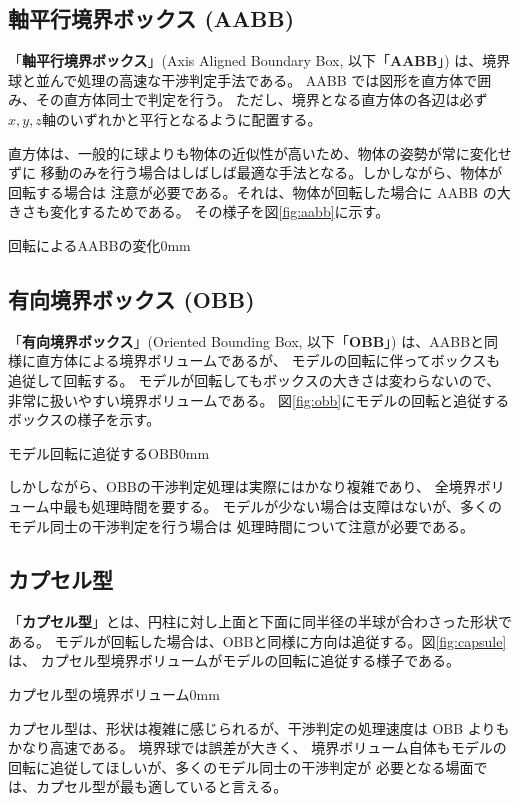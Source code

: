 \subsection{軸平行境界ボックス (AABB)}
「\textbf{軸平行境界ボックス}」(Axis Aligned Boundary Box, 以下「\textbf{AABB}」)
は、境界球と並んで処理の高速な干渉判定手法である。
AABB では図形を直方体で囲み、その直方体同士で判定を行う。
ただし、境界となる直方体の各辺は必ず \(x,y,z軸\)のいずれかと平行となるように配置する。

直方体は、一般的に球よりも物体の近似性が高いため、物体の姿勢が常に変化せずに
移動のみを行う場合はしばしば最適な手法となる。しかしながら、物体が回転する場合は
注意が必要である。それは、物体が回転した場合に AABB の大きさも変化するためである。
その様子を図\ref{fig:aabb}に示す。

	{回転によるAABBの変化}{0mm}

\subsection{有向境界ボックス (OBB)}
「\textbf{有向境界ボックス}」(Oriented Bounding Box, 以下「\textbf{OBB}」)
は、AABBと同様に直方体による境界ボリュームであるが、
モデルの回転に伴ってボックスも追従して回転する。
モデルが回転してもボックスの大きさは変わらないので、
非常に扱いやすい境界ボリュームである。
図\ref{fig:obb}にモデルの回転と追従するボックスの様子を示す。

	{モデル回転に追従するOBB}{0mm}

しかしながら、OBBの干渉判定処理は実際にはかなり複雑であり、
全境界ボリューム中最も処理時間を要する。
モデルが少ない場合は支障はないが、多くのモデル同士の干渉判定を行う場合は
処理時間について注意が必要である。

\subsection{カプセル型}
「\textbf{カプセル型}」とは、円柱に対し上面と下面に同半径の半球が合わさった形状である。
モデルが回転した場合は、OBBと同様に方向は追従する。図\ref{fig:capsule}は、
カプセル型境界ボリュームがモデルの回転に追従する様子である。

	{カプセル型の境界ボリューム}{0mm}

カプセル型は、形状は複雑に感じられるが、干渉判定の処理速度は OBB よりもかなり高速である。
境界球では誤差が大きく、
境界ボリューム自体もモデルの回転に追従してほしいが、多くのモデル同士の干渉判定が
必要となる場面では、カプセル型が最も適していると言える。

